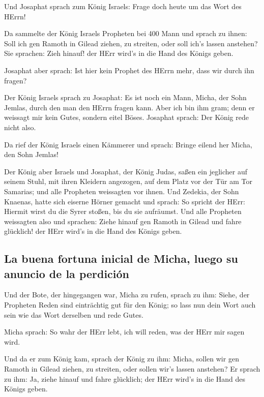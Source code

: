  Und Josaphat sprach zum König Israels: Frage doch heute
um das Wort des HErrn!

 Da sammelte der König Israels Propheten bei 400 Mann und
sprach zu ihnen: Soll ich gen Ramoth in Gilead ziehen, zu streiten, oder
soll ich's lassen anstehen? Sie sprachen: Zieh hinauf! der HErr wird's
in die Hand des Königs geben.

 Josaphat aber sprach: Ist hier kein Prophet des HErrn
mehr, dass wir durch ihn fragen?

 Der König Israels sprach zu Josaphat: Es ist noch ein
Mann, Micha, der Sohn Jemlas, durch den man den HErrn fragen kann. Aber
ich bin ihm gram; denn er weissagt mir kein Gutes, sondern eitel Böses.
Josaphat sprach: Der König rede nicht also.

 Da rief der König Israels einen Kämmerer und sprach:
Bringe eilend her Micha, den Sohn Jemlas!

 Der König aber Israels und Josaphat, der König Judas,
saßen ein jeglicher auf seinem Stuhl, mit ihren Kleidern angezogen, auf
dem Platz vor der Tür am Tor Samarias; und alle Propheten weissagten vor
ihnen.  Und Zedekia, der Sohn Knaenas, hatte sich eiserne
Hörner gemacht und sprach: So spricht der HErr: Hiermit wirst du die
Syrer stoßen, bis du sie aufräumst.  Und alle Propheten
weissagten also und sprachen: Ziehe hinauf gen Ramoth in Gilead und
fahre glücklich! der HErr wird's in die Hand des Königs geben.

\hypertarget{la-buena-fortuna-inicial-de-micha-luego-su-anuncio-de-la-perdiciuxf3n}{%
\subsection{La buena fortuna inicial de Micha, luego su anuncio de la
perdición}\label{la-buena-fortuna-inicial-de-micha-luego-su-anuncio-de-la-perdiciuxf3n}}

 Und der Bote, der hingegangen war, Micha zu rufen,
sprach zu ihm: Siehe, der Propheten Reden sind einträchtig gut für den
König; so lass nun dein Wort auch sein wie das Wort derselben und rede
Gutes.

 Micha sprach: So wahr der HErr lebt, ich will reden, was
der HErr mir sagen wird.

 Und da er zum König kam, sprach der König zu ihm: Micha,
sollen wir gen Ramoth in Gilead ziehen, zu streiten, oder sollen wir's
lassen anstehen? Er sprach zu ihm: Ja, ziehe hinauf und fahre glücklich;
der HErr wird's in die Hand des Königs geben.

